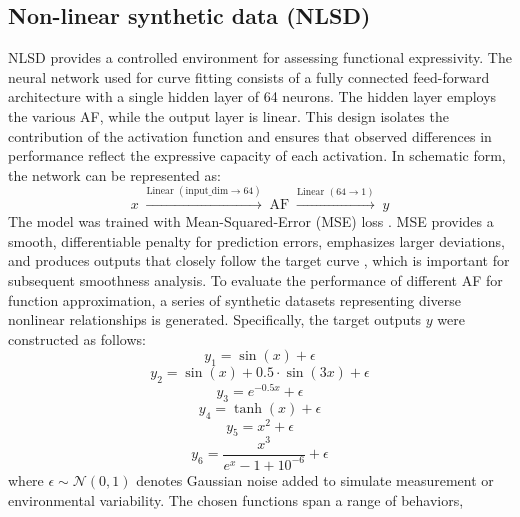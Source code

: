 \documentclass{article}
\begin{document}
\subsection{Non-linear synthetic data (NLSD)}
NLSD provides a controlled environment for assessing functional expressivity.
The neural network used for curve fitting consists of a fully connected feed-forward 
architecture with a single hidden layer of 64 neurons. 
The hidden layer employs the various AF, while the output layer is linear. 
This design isolates the contribution of the activation function and 
ensures that observed differences in performance reflect the expressive 
capacity of each activation.
In schematic form, the network can be represented as:
\begin{displaymath}
x \;\xrightarrow{\text{Linear } (\text{input\_dim} \to 64)}\;
\text{AF} \;\xrightarrow{\text{Linear } (64 \to 1)}\; y
\end{displaymath}
The model was trained with Mean-Squared-Error (MSE) loss \cite{BickelDoksum2015MathStats}.
MSE provides a smooth, differentiable penalty for prediction errors, 
emphasizes larger deviations, and produces outputs that closely follow 
the target curve \cite{Bishop2006PRML}, which is important for subsequent smoothness analysis.
To evaluate the performance of different AF for function approximation, 
a series of synthetic datasets representing diverse nonlinear relationships is generated. 
Specifically, the target outputs $y$ were constructed as follows:
\begin{equation}
y_1 = \sin(x) + \epsilon\tag{a}
\end{equation}
\begin{equation}
y_2 = \sin(x) + 0.5 \cdot \sin(3x) + \epsilon\tag{b}
\end{equation}
\begin{equation}
y_3 = e^{-0.5 x} + \epsilon\tag{c}
\end{equation}
\begin{equation}
y_4 = \tanh(x) + \epsilon\tag{d}
\end{equation}
\begin{equation}
y_5 = x^2 +  \epsilon\tag{e}
\end{equation}
\begin{equation}
y_6 = \frac{x^3}{e^{x} - 1 + 10^{-6}} + \epsilon\tag{f}
\end{equation}
where $\epsilon \sim \mathcal{N}(0,1)$ denotes Gaussian noise added to simulate measurement 
or environmental variability. The chosen functions span a range of behaviors, 
\end{document}
